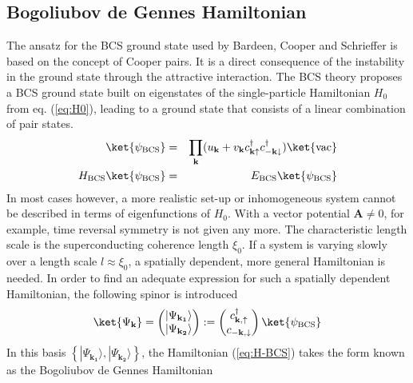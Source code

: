 \subsection*{Bogoliubov de Gennes Hamiltonian}
The ansatz for the BCS ground state used by Bardeen, Cooper and Schrieffer is based on the concept of Cooper pairs. It is a direct consequence of the instability in the ground state through the attractive interaction. The BCS theory proposes a BCS ground state built on eigenstates of the single-particle Hamiltonian $H_0$ from eq. (\ref{eq:H0}), leading to a ground state that consists of a linear combination of pair states. %
\begin{eqnarray}
\ket{\psi_\text{BCS}} &=& \prod_{ \mathbf{k} } (u_\mathbf{k} + v_\mathbf{k} c^{\dagger}_{ \mathbf{k} \uparrow } c^{\dagger}_{ - \mathbf{k} \downarrow }) \ket{\text{vac}} \\
H_\text{BCS} \ket{\psi_\text{BCS}} &=& E_\text{BCS} \ket{\psi_\text{BCS}}  
\end{eqnarray}
In most cases however, a more realistic set-up or inhomogeneous system cannot be described in terms of eigenfunctions of $H_0$. With a vector potential $\mathbf{A} \neq 0$, for example, time reversal symmetry is not given any more. %
The characteristic length scale is the superconducting coherence length $\xi_0$. If a system is varying slowly over a length scale $l \approx \xi_0$, a spatially dependent, more general Hamiltonian is needed. 
In order to find an adequate expression for such a spatially dependent Hamiltonian, the following spinor is introduced
\begin{equation}
\ket{\Psi_\mathbf{k}} = \begin{pmatrix}
| \Psi_\mathbf{k_1} \rangle \\ | \Psi_\mathbf{k_2} \rangle
\end{pmatrix} := \begin{pmatrix}
c^{\dagger}_{\mathbf{k}, \uparrow} \\ c_{- \mathbf{k}, \downarrow}
\end{pmatrix} \ket{\psi_\text{BCS}} \label{eq:spinor}
\end{equation}
In this basis $\left\{| \Psi_\mathbf{k_1} \rangle, | \Psi_\mathbf{k_2} \rangle \right\}$, the Hamiltonian (\ref{eq:H-BCS}) takes the form known as the Bogoliubov de Gennes Hamiltonian
